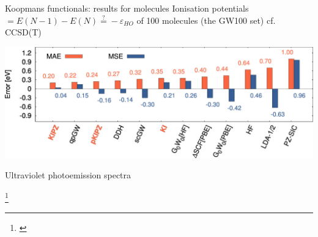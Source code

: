 \documentclass[xcolor=table,aspectratio=169]{beamer}
\newcommand\blfootcite[1]{%
  \begingroup
  \renewcommand\thefootnote{}\footnote{\hspace{-4ex}\cite{#1}}%
  \addtocounter{footnote}{-1}%
  \endgroup
}
\numberwithin{equation}{section}
\begin{document}
\begin{frame}{Koopmans functionals: results for molecules}
   \small
   Ionisation potentials $ = E(N-1) - E(N) \stackrel{?}{=} -\varepsilon_{HO}$ of 100 molecules (the GW100 set) cf. CCSD(T)
   \begin{center}
      \includegraphics[height=0.2\textwidth]{figures/colonna_2019_gw100_ip}
   \end{center}

   \vspace{-3ex}
   Ultraviolet photoemission spectra
   \begin{center}
   \end{center}
   \vspace{-2ex}

   \blfootcite{Colonna2018,Nguyen2015}
\end{frame}
\end{document}
